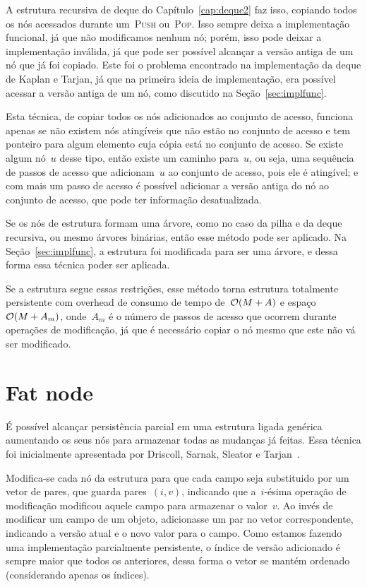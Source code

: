 \documentclass[../../main.tex]{subfiles}
\begin{document}
A estrutura recursiva de deque do Capítulo~\ref{cap:deque2} faz isso, copiando todos os nós acessados durante um~\textsc{Push} ou~\textsc{Pop}. Isso sempre deixa a implementação funcional, já que não modificamos nenhum nó; porém, isso pode deixar a implementação inválida, já que pode ser possível alcançar a versão antiga de um nó que já foi copiado. Este foi o problema encontrado na implementação da deque de Kaplan e Tarjan, já que na primeira ideia de implementação, era possível acessar a versão antiga de um nó, como discutido na Seção~\ref{sec:implfunc}.

Esta técnica, de copiar todos os nós adicionados ao conjunto de acesso, funciona apenas se não existem nós atingíveis que não estão no conjunto de acesso e tem ponteiro para algum elemento cuja cópia está no conjunto de acesso. Se existe algum nó~$u$ desse tipo, então existe um caminho para~$u$, ou seja, uma sequência de passos de acesso que adicionam~$u$ ao conjunto de acesso, pois ele é atingível; e com mais um passo de acesso é possível adicionar a versão antiga do nó ao conjunto de acesso, que pode ter informação desatualizada.

Se os nós de estrutura formam uma árvore, como no caso da pilha e da deque recursiva, ou mesmo árvores binárias, então esse método pode ser aplicado. Na Seção~\ref{sec:implfunc}, a estrutura foi modificada para ser uma árvore, e dessa forma essa técnica poder ser aplicada.

Se a estrutura segue essas restrições, esse método torna estrutura totalmente persistente com overhead de consumo de tempo de~$\mathcal{O}(M+A)$ e espaço~$\mathcal{O}(M+A_m)$, onde~$A_m$ é o número de passos de acesso que ocorrem durante operações de modificação, já que é necessário copiar o nó mesmo que este não vá ser modificado.

\section{Fat node}

É possível alcançar persistência parcial em uma estrutura ligada genérica aumentando os seus nós para armazenar todas as mudanças já feitas. Essa técnica foi inicialmente apresentada por Driscoll, Sarnak, Sleator e Tarjan~\cite{DriscollSST1989}.

Modifica-se cada nó da estrutura para que cada campo seja substituido por um vetor de pares, que guarda pares~$(i, v)$, indicando que a~$i$-ésima operação de modificação modificou aquele campo para armazenar o valor~$v$. Ao invés de modificar um campo de um objeto, adicionasse um par no vetor correspondente, indicando a versão atual e o novo valor para o campo. Como estamos fazendo uma implementação parcialmente persistente, o índice de versão adicionado é sempre maior que todos os anteriores, dessa forma o vetor se mantém ordenado (considerando apenas os índices).
\end{document}

